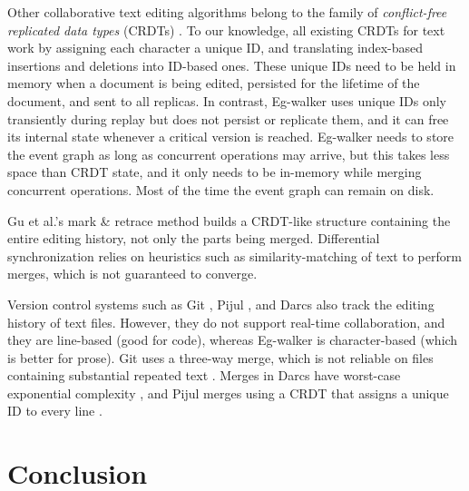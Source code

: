 \documentclass[sigplan,10pt]{acmart}
\newcommand{\algname}{Eg-walker\xspace}
\begin{document}

Other collaborative text editing algorithms \cite{Preguica2009,Roh2011RGA,fugue,Weiss2010} belong to the family of \emph{conflict-free replicated data types} (CRDTs) \cite{Shapiro2011}.
To our knowledge, all existing CRDTs for text work by assigning each character a unique ID, and translating index-based insertions and deletions into ID-based ones.
These unique IDs need to be held in memory when a document is being edited, persisted for the lifetime of the document, and sent to all replicas.
In contrast, \algname uses unique IDs only transiently during replay but does not persist or replicate them, and it can free its internal state whenever a critical version is reached.
\algname needs to store the event graph as long as concurrent operations may arrive, but this takes less space than CRDT state, and it only needs to be in-memory while merging concurrent operations.
Most of the time the event graph can remain on disk.

Gu et al.'s mark \& retrace method \cite{Gu2005} builds a CRDT-like structure containing the entire editing history, not only the parts being merged.
Differential synchronization \cite{Fraser2009} relies on heuristics such as similarity-matching of text to perform merges, which is not guaranteed to converge.

Version control systems such as Git \cite{Coglan2019}, Pijul \cite{pijul}, and Darcs \cite{darcs} also track the editing history of text files.
However, they do not support real-time collaboration, and they are line-based (good for code), whereas \algname is character-based (which is better for prose).
Git uses a three-way merge, which is not reliable on files containing substantial repeated text \cite{Khanna2007}.
Merges in Darcs have worst-case exponential complexity \cite{darcs-book}, and Pijul merges using a CRDT that assigns a unique ID to every line \cite{pijul-theory}.

\section{Conclusion}
\end{document}
